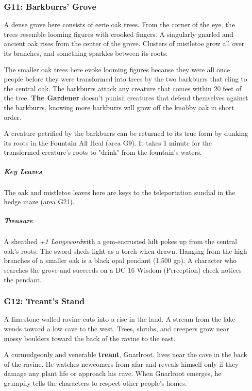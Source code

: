 \documentclass[10pt,a4paper,twoside,bg=print,twocolumn,openany,nodeprecatedcode]{dndbook}
\begin{document}
\subsubsection{G11: Barkburrs' Grove}
\begin{DndReadAloud}{}
A dense grove here consists of eerie oak trees. From the corner of the eye, the trees resemble looming figures with crooked fingers. A singularly gnarled and ancient oak rises from the center of the grove. Clusters of mistletoe grow all over its branches, and something sparkles between its roots.

\end{DndReadAloud}

The smaller oak trees here evoke looming figures because they were all once people before they were transformed into trees by the two barkburrs that cling to the central oak. The barkburrs attack any creature that comes within 20 feet of the tree. \textbf{The Gardener} doesn't punish creatures that defend themselves against the barkburrs, knowing more barkburrs will grow off the knobby oak in short order.

A creature petrified by the barkburrs can be returned to its true form by dunking its roots in the Fountain All Heal (area G9). It takes 1 minute for the transformed creature's roots to "drink" from the fountain's waters.

\subparagraph{Key Leaves}
The oak and mistletoe leaves here are keys to the teleportation sundial in the hedge maze (area G21).

\subparagraph{Treasure}
A sheathed \textit{+1 Longsword}with a gem-encrusted hilt pokes up from the central oak's roots. The sword sheds light as a torch when drawn. Hanging from the high branches of a smaller oak is a black opal pendant (1,500 gp). A character who searches the grove and succeeds on a DC 16 Wisdom (Perception) check notices the pendant.

\subsubsection{G12: Treant's Stand}
\begin{DndReadAloud}{}
A limestone-walled ravine cuts into a rise in the land. A stream from the lake wends toward a low cave to the west. Trees, shrubs, and creepers grow near mossy boulders toward the back of the ravine to the east.

\end{DndReadAloud}

A curmudgeonly and venerable \textbf{treant}, Gnarlroot, lives near the cave in the back of the ravine. He watches newcomers from afar and reveals himself only if they damage any plant life or approach his cave. When Gnarlroot emerges, he grumpily tells the characters to respect other people's homes.
\end{document}
